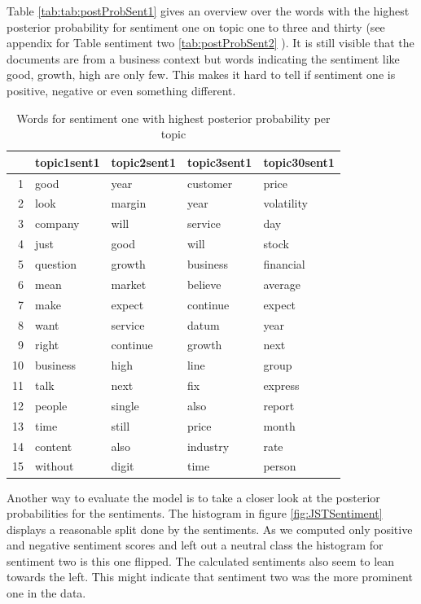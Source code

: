 Table \ref{tab:tab:postProbSent1} gives an overview over the words  with the highest posterior probability for sentiment one on topic one to three and thirty (see appendix for Table sentiment two \ref{tab:postProbSent2} ). It is still visible that the documents are from a business context but words indicating the sentiment like good, growth, high are only few. This makes it hard to tell if sentiment one is positive, negative or even something different. \\
\begin{table}[ht]
\centering
\begin{tabular}{rllll}
  \hline
 & topic1sent1 & topic2sent1 & topic3sent1 & topic30sent1 \\ 
  \hline
1 & good & year & customer & price \\ 
  2 & look & margin & year & volatility \\ 
  3 & company & will & service & day \\ 
  4 & just & good & will & stock \\ 
  5 & question & growth & business & financial \\ 
  6 & mean & market & believe & average \\ 
  7 & make & expect & continue & expect \\ 
  8 & want & service & datum & year \\ 
  9 & right & continue & growth & next \\ 
  10 & business & high & line & group \\ 
  11 & talk & next & fix & express \\ 
  12 & people & single & also & report \\ 
  13 & time & still & price & month \\ 
  14 & content & also & industry & rate \\ 
  15 & without & digit & time & person \\ 
   \hline
\end{tabular}\label{tab:postProbSent1}
\caption{Words for sentiment one with highest posterior probability per topic}
\end{table}
Another way to evaluate the model is to take a closer look at the posterior probabilities for the sentiments. The histogram in figure \ref{fig:JSTSentiment} displays a reasonable split done by the sentiments. As we computed only positive and negative sentiment scores and left out a neutral class the histogram for sentiment two is this one flipped. The calculated sentiments also seem to lean towards the left. This might indicate that sentiment two was the more prominent one in the data. \\
